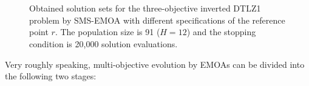 \documentclass[conference]{IEEEtran}
\begin{document}
\begin{figure}[!t]
  \centering
  \quad
  \\
  \quad
  \\
  \caption{Obtained solution sets for the three-objective inverted DTLZ1 problem by SMS-EMOA 
  with different specifications of the reference point $r$. 
  The population size is 91 ($H = 12$) and the stopping condition is 20,000 solution evaluations. 
  }
  \label{dm1}
\end{figure}

%
% 
Very roughly speaking, multi-objective evolution by EMOAs can be divided into the following
two stages:
\end{document}
